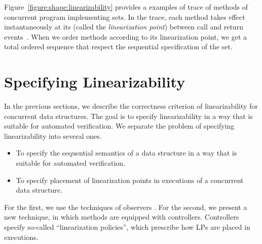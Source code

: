 %
Figure~\ref{figure:shape:linearizability} provides a examples of trace of methods of concurrent program implementing sets.
In the trace, each method takes effect
instantaneously at its (called the \emph{linearization point})
between call and return events~\cite{HeWi:linearizability}. When we order methods according to its linearization point, we get a total ordered sequence that respect the sequential specification of the set.



\endgroup

\chapter{Specifying Linearizability}
In the previous sections, we describe the correctness criterion of linearizability for concurrent data structures. The goal is to specify linearizability in a way that is suitable for automated verification.
We separate the problem of specifying linearizability into several ones.
\begin{itemize}

 \item  To specify the sequential semantics of a data structure in a way that is suitable for automated verification.
  \item To specify placement of linearization points in executions of a concurrent data structure.
  	 
\end{itemize}
  For the first, we use the techniques of observers \cite{AHHR:integrated:rep}. For the second, we present a new technique, in which methods are equipped with controllers. Controllers specify so-called ``linearization policies'', which prescribe how LPs are placed in executions.
 

